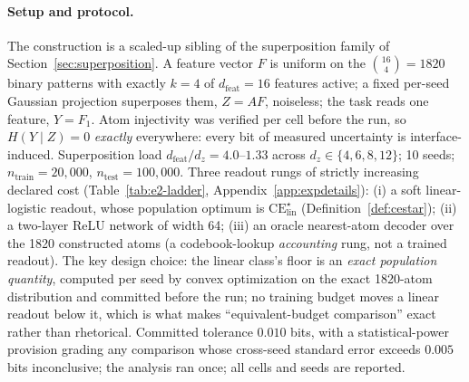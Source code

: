 \documentclass[twocolumn,10pt]{article}
\theoremstyle{definition}
\theoremstyle{remark}
\newcommand{\dfeat}{d_{\mathrm{feat}}}
\newcommand{\dz}{d_z}
\newcommand{\CE}{\mathrm{CE}}
\begin{document}
\paragraph{Setup and protocol.} The construction is a scaled-up
sibling of the superposition family of
Section~\ref{sec:superposition}. A feature vector $F$ is uniform on
the $\binom{16}{4} = 1820$ binary patterns with exactly $k = 4$ of
$\dfeat = 16$ features active; a fixed per-seed Gaussian projection
superposes them, $Z = AF$, noiseless; the task reads one feature,
$Y = F_1$. Atom injectivity was verified per cell before the run, so
$H(Y \mid Z) = 0$ \emph{exactly} everywhere: every bit of measured
uncertainty is interface-induced. Superposition load
$\dfeat / \dz = 4.0$--$1.33$ across $\dz \in \{4, 6, 8, 12\}$; 10
seeds; $n_{\mathrm{train}} = 20{,}000$,
$n_{\mathrm{test}} = 100{,}000$. Three readout rungs of strictly
increasing declared cost (Table~\ref{tab:e2-ladder},
Appendix~\ref{app:expdetails}): (i) a soft linear-logistic readout,
whose population optimum is $\CE^{\star}_{\mathrm{lin}}$
(Definition~\ref{def:cestar}); (ii) a two-layer ReLU network of width
64; (iii) an oracle nearest-atom decoder over the 1820 constructed
atoms (a codebook-lookup \emph{accounting} rung, not a trained
readout). The key design choice: the linear class's floor is an
\emph{exact population quantity}, computed per seed by convex
optimization on the exact 1820-atom distribution and committed before
the run; no training budget moves a linear readout below it, which
is what makes ``equivalent-budget comparison'' exact rather than
rhetorical. Committed tolerance $0.010$ bits, with a
statistical-power provision grading any comparison whose cross-seed
standard error exceeds $0.005$ bits inconclusive; the analysis ran
once; all cells and seeds are reported.
\end{document}
